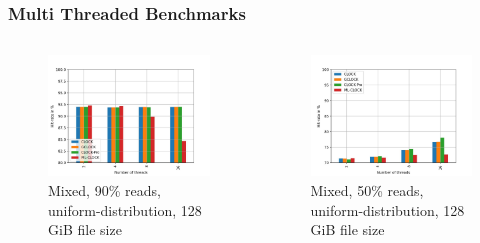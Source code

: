 \documentclass[
	aspectratio=169,
	compress,
]{beamer}
\newcommand{\navframetitle}[1]{\frametitle{#1\hfill{\footnotesize\lastsection{}}}}
\begin{document}
\begin{frame}[fragile]
	\navframetitle{Multi Threaded Benchmarks}

	\begin{columns}
		\begin{column}{0.5\textwidth}
			\begin{figure}[ht]
    			\centering
    			\includegraphics[width=\textwidth]{multi_128_gb_rw_90to10_uniform.jpg}
        		\caption{Mixed, 90\% reads, uniform-distribution, 128 GiB file size}
        		\label{fig:rw_90to10 128 uniform}
			\end{figure}
		\end{column}
		\begin{column}{0.5\textwidth}
			\begin{figure}[ht]
    			\centering
    			\includegraphics[width=\textwidth]{multi_128_gb_rw_50to50_uniform.jpg}
        		\caption{Mixed, 50\% reads, uniform-distribution, 128 GiB file size}
        		\label{fig:rw_50to50 128 uniform}
			\end{figure}			
		\end{column}
	\end{columns}
\end{frame}
\end{document}
